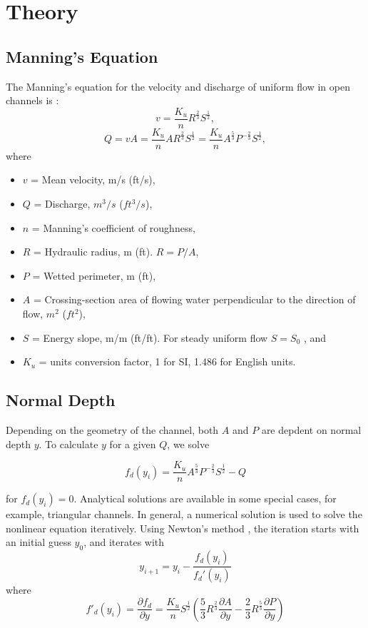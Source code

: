\section{Theory}
\subsection{Manning's Equation}
The Manning's equation for the velocity and discharge of uniform flow in open channels is \cite{Chow1959,French1985,Munson2013,hds4}:
\begin{equation}  
v = \frac{K_u}{n}R^{\frac{2}{3}}S^{\frac{1}{2}},
\label{Eq:v}
\end{equation}
\begin{equation}  
Q = vA = \frac{K_u}{n}AR^{\frac{2}{3}}S^{\frac{1}{2}}=\frac{K_u}{n}A^{\frac{5}{3}}P^{-\frac{2}{3}}S^{\frac{1}{2}},
\label{Eq:Q}
\end{equation}
where
\begin{itemize}
\item[] $v$ = Mean velocity, m/s (ft/s),
\item[] $Q$ = Discharge, $m^3/s$ ($ft^3/s$),
\item[] $n$ = Manning's coefficient of roughness,
\item[] $R$ = Hydraulic radius, m (ft). $R = P/A$,
\item [] $P$ = Wetted perimeter, m (ft),
\item [] $A$ = Crossing-section area of flowing water perpendicular to the direction of flow, $m^2$ ($ft^2$),
\item[] $S$ = Energy slope, m/m (ft/ft). For steady uniform flow $S=S_0$ , and
\item[] $K_u$ = units conversion factor, 1 for SI, 1.486 for English units.
\end{itemize}

\subsection{Normal Depth}
Depending on the geometry of the channel, both $A$ and $P$ are depdent on normal depth $y$. To calculate $y$ for a given $Q$, we solve 

\begin{equation}  
f_d(y_{i})= \frac{K_u}{n}A^{\frac{5}{3}}P^{-\frac{2}{3}}S^{\frac{1}{2}} - Q 
\end{equation}

\noindent for $f_d(y_{i}) = 0$. Analytical solutions are available in some special cases, for example, triangular channels. In general, a numerical solution is used to solve the nonlinear equation iteratively. Using Newton's method \cite{Strang1991}, the iteration starts with an initial guess $y_0$, and iterates with
\begin{equation}  
y_{i+1} = y_i -\frac{f_d(y_{i})}{f_d'(y_{i})}
\end{equation}
where
\begin{equation}  
f'_d(y_{i})=\frac{\partial f_d}{\partial y}= \frac{K_u}{n}S^{\frac{1}{2}}\left(\frac{5}{3}R^{\frac{2}{3}}\frac{\partial A}{\partial y} -  \frac{2}{3}R^{\frac{5}{3}}\frac{\partial P}{\partial y}\right)
\end{equation}

